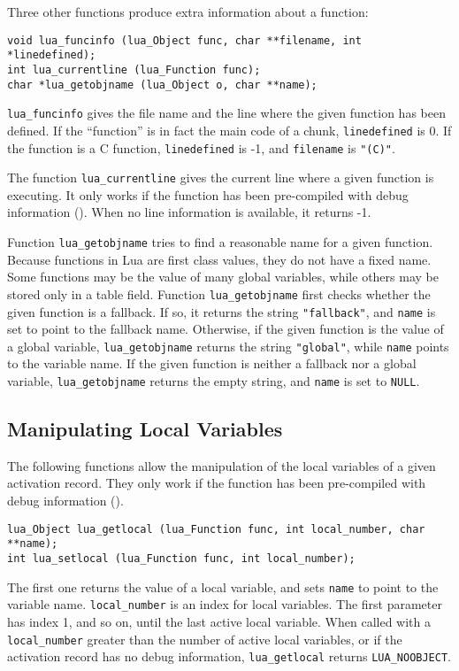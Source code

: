 Three other functions produce extra information about a function:
\begin{verbatim}
void lua_funcinfo (lua_Object func, char **filename, int *linedefined);
int lua_currentline (lua_Function func);
char *lua_getobjname (lua_Object o, char **name);
\end{verbatim}
\verb'lua_funcinfo' gives the file name and the line where the
given function has been defined.
If the ``function'' is in fact the main code of a chunk,
\verb'linedefined' is 0.
If the function is a C function,
\verb'linedefined' is -1, and \verb'filename' is \verb'"(C)"'.

The function \verb'lua_currentline' gives the current line where
a given function is executing.
It only works if the function has been pre-compiled with debug
information ().
When no line information is available, it returns -1.

Function \verb'lua_getobjname' tries to find a reasonable name for
a given function.
Because functions in Lua are first class values,
they do not have a fixed name.
Some functions may be the value of many global variables,
while others may be stored only in a table field.
Function \verb'lua_getobjname' first checks whether the given
function is a fallback.
If so, it returns the string \verb'"fallback"',
and \verb'name' is set to point to the fallback name.
Otherwise, if the given function is the value of a global variable,
\verb'lua_getobjname' returns the string \verb'"global"',
while \verb'name' points to the variable name.
If the given function is neither a fallback nor a global variable,
\verb'lua_getobjname' returns the empty string,
and \verb'name' is set to \verb'NULL'.

\subsection{Manipulating Local Variables}

The following functions allow the manipulation of the
local variables of a given activation record.
They only work if the function has been pre-compiled with debug
information ().
\begin{verbatim}
lua_Object lua_getlocal (lua_Function func, int local_number, char **name);
int lua_setlocal (lua_Function func, int local_number);
\end{verbatim}
The first one returns the value of a local variable,
and sets \verb'name' to point to the variable name.
\verb'local_number' is an index for local variables.
The first parameter has index 1, and so on, until the
last active local variable.
When called with a \verb'local_number' greater than the
number of active local variables,
or if the activation record has no debug information,
\verb'lua_getlocal' returns \verb'LUA_NOOBJECT'.

